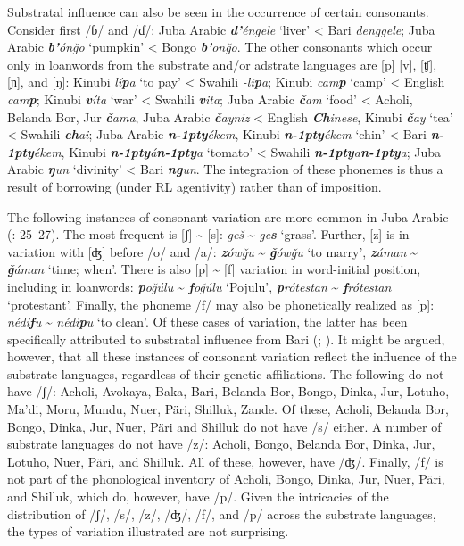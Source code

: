 \documentclass[output=paper]{langsci/langscibook}
\begin{document}
Substratal influence can also be seen in the occurrence of certain consonants. Consider first /ɓ/ and /ɗ/: Juba Arabic \textit{\textbf{d'}éngele} ‘liver’ < Bari \textit{denggele}; Juba Arabic \textit{\textbf{b'}ónǧo} ‘pumpkin’ < Bongo \textit{\textbf{b'}onǧo}. The other consonants which occur only in loanwords from the substrate and/or adstrate languages are [p] [v], [ʧ], [ɲ], and [ŋ]: Kinubi \textit{lí\textbf{p}a} ‘to pay’ < Swahili \textit{-li\textbf{p}a}; Kinubi \textit{cam\textbf{p}} ‘camp’ < English \textit{cam\textbf{p}}; Kinubi \textit{\textbf{v}íta} ‘war’ < Swahili \textit{\textbf{v}ita}; Juba Arabic \textit{\textbf{č}am} ‘food’ < Acholi, Belanda Bor, Jur \textit{\textbf{č}ama}, Juba Arabic \textit{\textbf{č}ayniz} < English \textit{\textbf{Ch}inese}, Kinubi \textit{\textbf{č}ay} ‘tea’ < Swahili \textit{\textbf{ch}ai}; Juba Arabic \textit{\textbf{n\kern -1pty}ékem}, Kinubi \textit{\textbf{n\kern -1pty}ékem} ‘chin’ < Bari \textit{\textbf{n\kern -1pty}ékem}, Kinubi \textit{\textbf{n\kern -1pty}á\textbf{n\kern -1pty}a} ‘tomato’ < Swahili \textit{\textbf{n\kern -1pty}a\textbf{n\kern -1pty}a}; Juba Arabic \textit{\textbf{ŋ}un} ‘divinity’ < Bari \textit{\textbf{ng}un}. The integration of these phonemes is thus a result of borrowing (under RL agentivity) rather than of imposition.

  The following instances of consonant variation are more common in Juba Arabic (\citealt{Manfredi2017}: 25–27). The most frequent is [ʃ] {\textasciitilde} [s]: \textit{geš} {\textasciitilde} \textit{ge\textbf{s}} ‘grass’. Further, [z] is in variation with [ʤ] before /o/ and /a/: \textit{\textbf{z}ówǧu} {\textasciitilde} \textit{\textbf{ǧ}ówǧu} ‘to marry’, \textit{\textbf{z}áman} {\textasciitilde} \textit{\textbf{ǧ}áman} ‘time; when’. There is also [p] {\textasciitilde} [f] variation in word-initial position, including in loanwords: \textit{\textbf{p}oǧúlu} {\textasciitilde} \textit{\textbf{f}oǧúlu} ‘Pojulu’, \textit{\textbf{p}rótestan} {\textasciitilde} \textit{\textbf{f}rótestan} ‘protestant’. Finally, the phoneme /f/ may also be phonetically realized as [p]: \textit{nédi\textbf{f}u} {\textasciitilde} \textit{nédi\textbf{p}u} ‘to clean’. Of these cases of variation, the latter has been specifically attributed to substratal influence from Bari (\citealt{Miller1989}; \citealt{Manfredi2017}). It might be argued, however, that all these instances of consonant variation reflect the influence of the substrate languages, regardless of their genetic affiliations. The following do not have /ʃ/: Acholi, Avokaya, Baka, Bari, Belanda Bor, Bongo, Dinka, Jur, Lotuho, Ma'di, Moru, Mundu, Nuer, Päri, Shilluk, Zande. Of these, Acholi, Belanda Bor, Bongo, Dinka, Jur, Nuer, Päri and Shilluk do not have /s/ either. A number of substrate languages do not have /z/: Acholi, Bongo, Belanda Bor, Dinka, Jur, Lotuho, Nuer, Päri, and Shilluk. All of these, however, have /ʤ/. Finally, /f/ is not part of the phonological inventory of Acholi, Bongo, Dinka, Jur, Nuer, Päri, and Shilluk, which do, however, have /p/. Given the intricacies of the distribution of /ʃ/, /s/, /z/, /ʤ/, /f/, and /p/ across the substrate languages, the types of variation illustrated are not surprising. 
\end{document}
